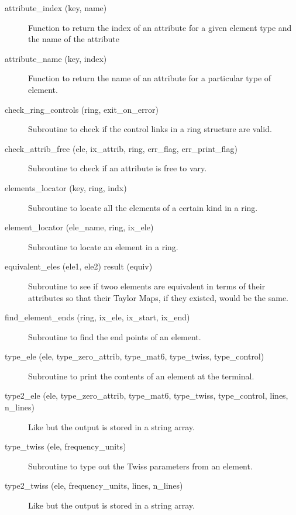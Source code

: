 \begin{description}

\item[attribute\_index (key, name)] \Newline
Function to return the index of an attribute for a given element 
type and the name of the attribute 

\item[attribute\_name (key, index)] \Newline
Function to return the name of an attribute for a particular type of element. 

\item[check\_ring\_controls (ring, exit\_on\_error)] \Newline
Subroutine to check if the control links in a ring structure are valid. 

\item[check\_attrib\_free (ele, ix\_attrib, ring, err\_flag, err\_print\_flag)] \Newline
Subroutine to check if an attribute is free to vary.

\item[elements\_locator (key, ring, indx)] \Newline
Subroutine to locate all the elements of a certain kind in a ring. 

\item[element\_locator (ele\_name, ring, ix\_ele)] \Newline
Subroutine to locate an element in a ring. 

\item[equivalent\_eles (ele1, ele2) result (equiv)] \Newline 
Subroutine to see if twoo elements are equivalent in terms of their attributes so
that their Taylor Maps, if they existed, would be the same.

\item[find\_element\_ends (ring, ix\_ele, ix\_start, ix\_end)] \Newline
Subroutine to find the end points of an element. 

\item[type\_ele (ele, type\_zero\_attrib, type\_mat6, type\_twiss, 
type\_control)] \Newline
Subroutine to print the contents of an element at the terminal. 

\item[type2\_ele (ele, type\_zero\_attrib, type\_mat6, type\_twiss, 
type\_control, lines, n\_lines)] \Newline
Like  but the output is stored in a string array. 

\item[type\_twiss (ele, frequency\_units)] \Newline
Subroutine to type out the Twiss parameters from an element. 

\item[type2\_twiss (ele, frequency\_units, lines, n\_lines)] \Newline
Like  but the output is stored in a string array. 

\end{description}

